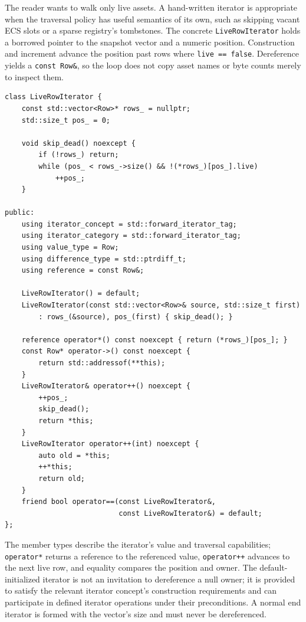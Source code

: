 The reader wants to walk only live assets. A hand-written iterator is appropriate when the traversal policy has useful semantics of its own, such as skipping vacant ECS slots or a sparse registry's tombstones. The concrete \texttt{LiveRowIterator} holds a borrowed pointer to the snapshot vector and a numeric position. Construction and increment advance the position past rows where \texttt{live\ ==\ false}. Dereference yields a \texttt{const\ Row\&}, so the loop does not copy asset names or byte counts merely to inspect them.

\begin{verbatim}
class LiveRowIterator {
    const std::vector<Row>* rows_ = nullptr;
    std::size_t pos_ = 0;

    void skip_dead() noexcept {
        if (!rows_) return;
        while (pos_ < rows_->size() && !(*rows_)[pos_].live)
            ++pos_;
    }

public:
    using iterator_concept = std::forward_iterator_tag;
    using iterator_category = std::forward_iterator_tag;
    using value_type = Row;
    using difference_type = std::ptrdiff_t;
    using reference = const Row&;

    LiveRowIterator() = default;
    LiveRowIterator(const std::vector<Row>& source, std::size_t first)
        : rows_(&source), pos_(first) { skip_dead(); }

    reference operator*() const noexcept { return (*rows_)[pos_]; }
    const Row* operator->() const noexcept {
        return std::addressof(**this);
    }
    LiveRowIterator& operator++() noexcept {
        ++pos_;
        skip_dead();
        return *this;
    }
    LiveRowIterator operator++(int) noexcept {
        auto old = *this;
        ++*this;
        return old;
    }
    friend bool operator==(const LiveRowIterator&,
                           const LiveRowIterator&) = default;
};
\end{verbatim}

The member types describe the iterator's value and traversal capabilities; \texttt{operator*} returns a reference to the referenced value, \texttt{operator++} advances to the next live row, and equality compares the position and owner. The default-initialized iterator is not an invitation to dereference a null owner; it is provided to satisfy the relevant iterator concept's construction requirements and can participate in defined iterator operations under their preconditions. A normal end iterator is formed with the vector's size and must never be dereferenced.

